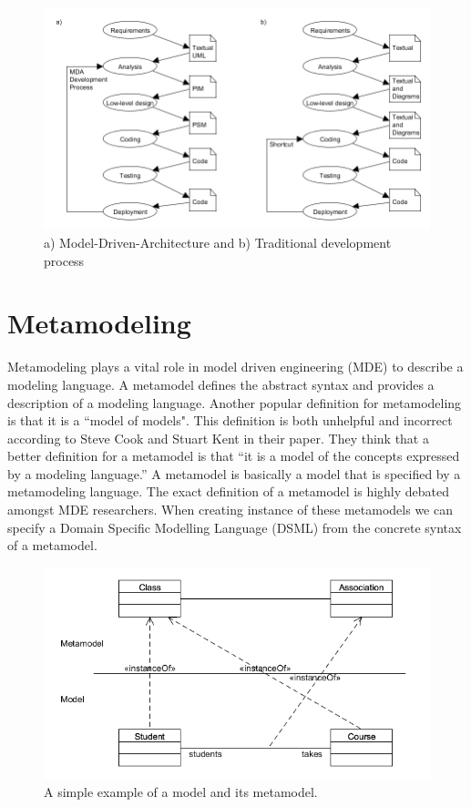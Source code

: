 \begin{figure}[H]
	\centering
	\includegraphics[scale=0.5]{./Figures/MDA.png}
	\caption[Software Development with MDA]
	{a) Model-Driven-Architecture and b) Traditional development process}
	\label{fig:MDA}
\end{figure}



\section{Metamodeling}

Metamodeling plays a vital role in model driven engineering (MDE) to describe a
modeling language. A metamodel defines the abstract syntax and provides a
description of a modeling language. Another popular definition for
metamodeling is that it is a ``model of models". This definition is both
unhelpful and incorrect according to Steve Cook and Stuart Kent in their
paper\cite{Cook2008}. They think that a better definition for a metamodel is
that ``it is a model of the concepts expressed by a modeling language.'' A
metamodel is basically a model that is specified by a metamodeling language.
The exact definition of a metamodel is highly debated amongst MDE
researchers\cite{Rutle_thesis}. When creating instance of these metamodels we can
specify a Domain Specific Modelling Language (DSML) from the concrete syntax of
a metamodel.

\begin{figure}[H]
	\centering
	\includegraphics[scale=0.6]{./Figures/SimpleMetamodel.png}
	\caption[Example of a model and metamodel]
	{A simple example of a model and its metamodel.}
	\label{fig:SimpleMetamodel}
\end{figure}

